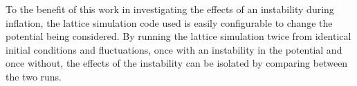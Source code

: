 \documentclass[letterpaper,11pt]{article}
\begin{document}
To the benefit of this work in investigating the effects of an instability during inflation, the lattice simulation code used is easily configurable to change the potential being considered. By running the lattice simulation twice from identical initial conditions and fluctuations, once with an instability in the potential and once without, the effects of the instability can be isolated by comparing between the two runs.





\end{document}
